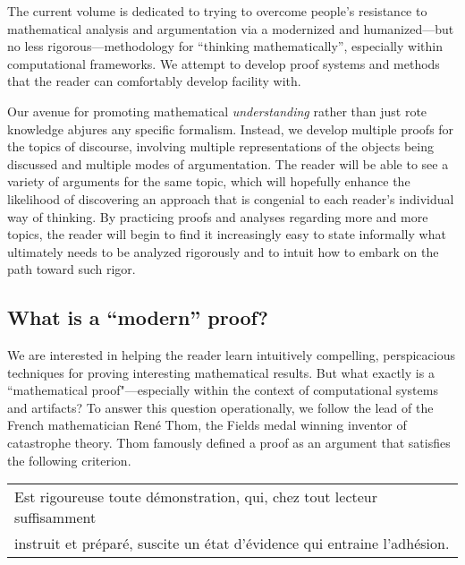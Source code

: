 The current volume is dedicated to trying to overcome people's
resistance to mathematical analysis and argumentation via a modernized
and humanized---but no less rigorous---methodology for ``thinking
mathematically'', especially within computational frameworks.  We
attempt to develop proof systems and methods that the reader can
comfortably develop facility with.

Our avenue for promoting mathematical {\em understanding} rather than
just rote knowledge abjures any specific formalism.  Instead, we
develop multiple proofs for the topics of discourse, involving
multiple representations of the objects being discussed and multiple
modes of argumentation.  The reader will be able to see a variety of
arguments for the same topic, which will hopefully enhance the
likelihood of discovering an approach that is congenial to each
reader's individual way of thinking.  By practicing proofs and
analyses regarding more and more topics, the reader will begin to find
it increasingly easy to state informally what ultimately needs to be
analyzed rigorously and to intuit how to embark on the path toward
such rigor.


\subsection{What is a ``modern'' proof?}

We are interested in helping the reader learn intuitively compelling,
perspicacious techniques for proving interesting mathematical results.
But what exactly is a ``mathematical proof"---especially within the
context of computational systems and artifacts?  To answer this
question operationally, we follow the lead of the French mathematician
Ren\'e Thom,
the Fields medal winning inventor of catastrophe theory.  Thom famously
defined a proof as an argument that satisfies the following
criterion. \\
\hspace*{.2in}
\begin{tabular}{l}
Est rigoureuse toute d\'{e}monstration, qui, chez tout lecteur
suffisamment \\
instruit et pr\'{e}par\'{e}, suscite un \'{e}tat d'\'{e}vidence qui
entraine l'adh\'{e}sion.
\end{tabular}



